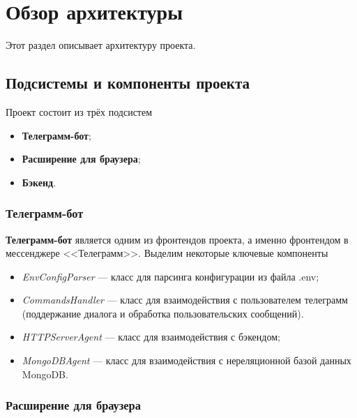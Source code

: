 \chapter{Обзор архитектуры}
	\label{chapter4}

	Этот раздел описывает архитектуру проекта.

	\section{Подсистемы и компоненты проекта}
		Проект состоит из трёх подсистем
		\begin{itemize}
			\item \textbf{Телеграмм-бот};
			
			\item \textbf{Расширение для браузера};
			
			\item \textbf{Бэкенд}.
		\end{itemize}
			
		\subsection{Телеграмм-бот}
			\begin{figure}[!h]
				\centering
				\def\svgwidth{\columnwidth}
				
			\end{figure}
			
			\textbf{Телеграмм-бот} является одним из фронтендов проекта, а именно фронтендом в мессенджере <<Телеграмм>>. Выделим некоторые ключевые компоненты
			\begin{itemize}
				\item \textit{EnvConfigParser} --- класс для парсинга конфигурации из файла .env;
				
				\item \textit{CommandsHandler} --- класс для взаимодействия с пользователем телеграмм (поддержание диалога и обработка пользовательских сообщений).
				
				\item \textit{HTTPServerAgent} --- класс для взаимодействия с бэкендом;
				
				\item \textit{MongoDBAgent} --- класс для взаимодействия с нереляционной базой данных MongoDB.
			\end{itemize}
		\subsection{Расширение для браузера}
			\begin{figure}[h!]
				\centering
				\def\svgwidth{\columnwidth}
				
			\end{figure}
			
